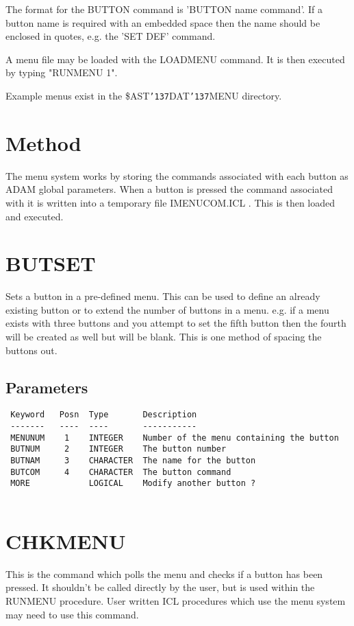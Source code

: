 \documentclass{book}
\renewcommand{\_}{{\tt\char'137}}     %
\begin{document}
The format for the BUTTON command is 'BUTTON name command'. If a button
name is required with an embedded space then the name should be enclosed
in quotes, e.g. the 'SET DEF' command.
 
A menu file may be loaded with the LOADMENU command. It is then executed
by typing "RUNMENU 1".
 
Example menus exist in the \$AST\_DAT\_MENU directory.
 
\section{Method}
The menu system works by storing the commands associated with each
button as ADAM global parameters. When a button is pressed the command
associated with it is written into a temporary file IMENUCOM.ICL .
This is then loaded and executed.
 
\section{BUTSET}
Sets a button in a pre-defined menu. This can be used to define an
already existing button or to extend the number of buttons in a menu.
e.g. if a menu exists with three buttons and you attempt to set the fifth
button then the fourth will be created as well but will be blank. This
is one method of spacing the buttons out.
 
\subsection{Parameters}
\begin{verbatim}
 Keyword   Posn  Type       Description
 -------   ----  ----       -----------
 MENUNUM    1    INTEGER    Number of the menu containing the button
 BUTNUM     2    INTEGER    The button number
 BUTNAM     3    CHARACTER  The name for the button
 BUTCOM     4    CHARACTER  The button command
 MORE            LOGICAL    Modify another button ?
 
\end{verbatim}\section{CHKMENU}
This is the command which polls the menu and checks if a button has
been pressed. It shouldn't be called directly by the user, but is used
within the RUNMENU procedure. User written ICL procedures which use
the menu system may need to use this command.
 
\end{document}
